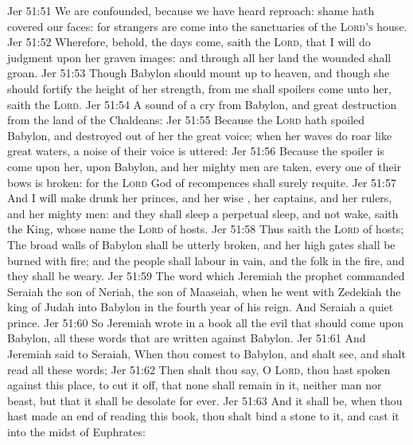 \vs Jer 51:51 We are confounded, because we have heard reproach: shame hath covered our faces: for strangers are come into the sanctuaries of the \textsc{Lord's} house.
\vs Jer 51:52 Wherefore, behold, the days come, saith the \textsc{Lord}, that I will do judgment upon her graven images: and through all her land the wounded shall groan.
\vs Jer 51:53 Though Babylon should mount up to heaven, and though she should fortify the height of her strength,  from me shall spoilers come unto her, saith the \textsc{Lord}.
\vs Jer 51:54 A sound of a cry  from Babylon, and great destruction from the land of the Chaldeans:
\vs Jer 51:55 Because the \textsc{Lord} hath spoiled Babylon, and destroyed out of her the great voice; when her waves do roar like great waters, a noise of their voice is uttered:
\vs Jer 51:56 Because the spoiler is come upon her,  upon Babylon, and her mighty men are taken, every one of their bows is broken: for the \textsc{Lord} God of recompences shall surely requite.
\vs Jer 51:57 And I will make drunk her princes, and her wise , her captains, and her rulers, and her mighty men: and they shall sleep a perpetual sleep, and not wake, saith the King, whose name  the \textsc{Lord} of hosts.
\vs Jer 51:58 Thus saith the \textsc{Lord} of hosts; The broad walls of Babylon shall be utterly broken, and her high gates shall be burned with fire; and the people shall labour in vain, and the folk in the fire, and they shall be weary.
\vs Jer 51:59 The word which Jeremiah the prophet commanded Seraiah the son of Neriah, the son of Maaseiah, when he went with Zedekiah the king of Judah into Babylon in the fourth year of his reign. And  Seraiah  a quiet prince.
\vs Jer 51:60 So Jeremiah wrote in a book all the evil that should come upon Babylon,  all these words that are written against Babylon.
\vs Jer 51:61 And Jeremiah said to Seraiah, When thou comest to Babylon, and shalt see, and shalt read all these words;
\vs Jer 51:62 Then shalt thou say, O \textsc{Lord}, thou hast spoken against this place, to cut it off, that none shall remain in it, neither man nor beast, but that it shall be desolate for ever.
\vs Jer 51:63 And it shall be, when thou hast made an end of reading this book,  thou shalt bind a stone to it, and cast it into the midst of Euphrates:
